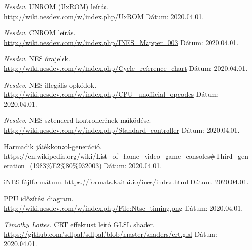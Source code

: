 \documentclass[
]{elteikthesis}[2020/02/26]
\begin{document}
\begin{thebibliography}{9}
	\textit{Nesdev.}
	UNROM (UxROM) leírás.
	\newline
	\url{http://wiki.nesdev.com/w/index.php/UxROM}
	\newline Dátum: 2020.04.01.
	
	\textit{Nesdev.}
	CNROM leírás.
	\newline
	\url{http://wiki.nesdev.com/w/index.php/INES_Mapper_003}
	\newline Dátum: 2020.04.01.
	
	\textit{Nesdev.}
	NES órajelek.
	\newline
	\url{http://wiki.nesdev.com/w/index.php/Cycle_reference_chart}
	\newline Dátum: 2020.04.01.
	
	\textit{Nesdev.}
	NES illegális opkódok.
	\newline
	\url{http://wiki.nesdev.com/w/index.php/CPU_unofficial_opcodes}
	\newline Dátum: 2020.04.01.
	
	\textit{Nesdev.}
	NES sztenderd kontrollerének működése.
	\newline
	\url{http://wiki.nesdev.com/w/index.php/Standard_controller}
	\newline Dátum: 2020.04.01.
	
	Harmadik játékkonzol-generáció.
	\newline
	\url{https://en.wikipedia.org/wiki/List_of_home_video_game_consoles#Third_generation_(1983\%E2\%80\%932003)}
	\newline Dátum: 2020.04.01.
	
	iNES fájlformátum.
	\newline
	\url{https://formats.kaitai.io/ines/index.html}
	\newline Dátum: 2020.04.01.
	
	PPU időzítési diagram.
	\newline
	\url{http://wiki.nesdev.com/w/index.php/File:Ntsc_timing.png}
	\newline Dátum: 2020.04.01.
	
	\textit{Timothy Lottes.}
	CRT effektust leíró GLSL shader.
	\newline
	\url{https://github.com/sdlpal/sdlpal/blob/master/shaders/crt.glsl}
	\newline Dátum: 2020.04.01.
\end{thebibliography}
\cleardoublepage
\end{document}
